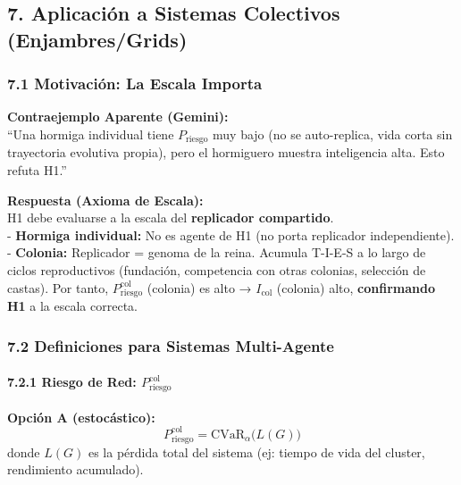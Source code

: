 \subsection{7. Aplicación a Sistemas Colectivos
(Enjambres/Grids)}\label{aplicaciuxf3n-a-sistemas-colectivos-enjambresgrids}

\subsubsection{7.1 Motivación: La Escala
Importa}\label{motivaciuxf3n-la-escala-importa}

\textbf{Contraejemplo Aparente (Gemini):}\\
``Una hormiga individual tiene \(P_{\text{riesgo}}\) muy bajo (no se
auto-replica, vida corta sin trayectoria evolutiva propia), pero el
hormiguero muestra inteligencia alta. Esto refuta H1.''

\textbf{Respuesta (Axioma de Escala):}\\
H1 debe evaluarse a la escala del \textbf{replicador compartido}.\\
- \textbf{Hormiga individual:} No es agente de H1 (no porta replicador
independiente).\\
- \textbf{Colonia:} Replicador = genoma de la reina. Acumula T-I-E-S a
lo largo de ciclos reproductivos (fundación, competencia con otras
colonias, selección de castas). Por tanto,
\(P_{\text{riesgo}}^{\text{col}}\) (colonia) es alto →
\(I_{\text{col}}\) (colonia) alto, \textbf{confirmando H1} a la escala
correcta.

\subsubsection{7.2 Definiciones para Sistemas
Multi-Agente}\label{definiciones-para-sistemas-multi-agente}

\paragraph{\texorpdfstring{7.2.1 Riesgo de Red:
\(P_{\text{riesgo}}^{\text{col}}\)}{7.2.1 Riesgo de Red: P\_\{\textbackslash text\{riesgo\}\}\^{}\{\textbackslash text\{col\}\}}}\label{riesgo-de-red-p_textriesgotextcol}

\textbf{Opción A (estocástico):}\\
\[
P_{\text{riesgo}}^{\text{col}} = \text{CVaR}_\alpha\big(L(G)\big)
\] donde \(L(G)\) es la pérdida total del sistema (ej: tiempo de vida
del cluster, rendimiento acumulado).

